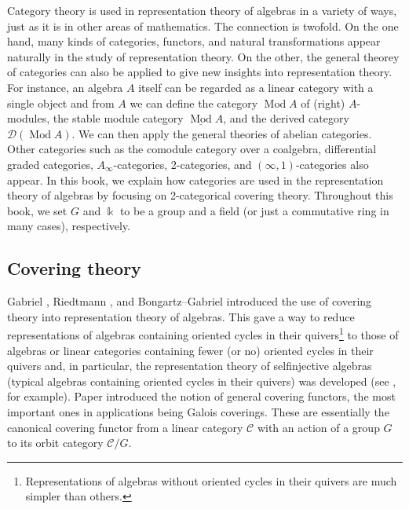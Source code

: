 \documentclass{surv-l}
\numberwithin{equation}{chapter}
\numberwithin{figure}{chapter}
\theoremstyle{plain}
\theoremstyle{definition}
\theoremstyle{remark}
\DeclareMathOperator{\Mod}{Mod}
\begin{document}
Category theory is used in representation theory of algebras in a variety of ways, just as it is in other areas of mathematics. The connection is twofold. On the one hand, many kinds of categories, functors, and natural transformations appear naturally in the study of representation theory. On the other, the general theorey of categories can also be applied to give new insights into representation theory.
For instance, an algebra $A$ itself can be regarded as
a linear category with a single object
and from $A$ we can define the category $\Mod A$ of (right) $A$-modules,
the stable module category $\underline{\Mod} A$, and the derived category
${\mathcal{D}}(\Mod A)$. We can then apply the general theories of abelian categories.
Other categories such as the comodule category over a coalgebra, differential graded categories, $A_\infty$-categories, 2-categories, and $(\infty, 1)$-categories also appear.
In this book, we explain how categories are used in the representation theory of algebras by focusing on 2-categorical covering theory.
Throughout this book, we set $G$ and $\Bbbk$ to be a group and a field
(or just a commutative ring in many cases), respectively.

\subsection*{Covering theory}
Gabriel \cite{Ga}, Riedtmann \cite{RieCov}, and Bongartz--Gabriel \cite{Bo-Ga}
introduced the use of covering theory into
representation theory of algebras. This gave a way to reduce
representations of algebras containing oriented cycles in their quivers\footnote{Representations of algebras without oriented cycles in their quivers
are much simpler than others.}
to those of algebras or linear categories containing fewer (or no) oriented cycles
in their quivers and, in particular, the representation theory of selfinjective algebras
(typical algebras containing oriented cycles in their quivers)
was developed (see \cite{RieClassA}, \cite{RieClassD} for example).
Paper \cite{Ga} introduced the notion of general covering functors, the most important ones in applications being Galois coverings.
These are essentially the canonical covering functor from
a linear category ${\mathcal{C}}$ with an action of a group $G$ to
its orbit category ${\mathcal{C}}/G$.
\end{document}
